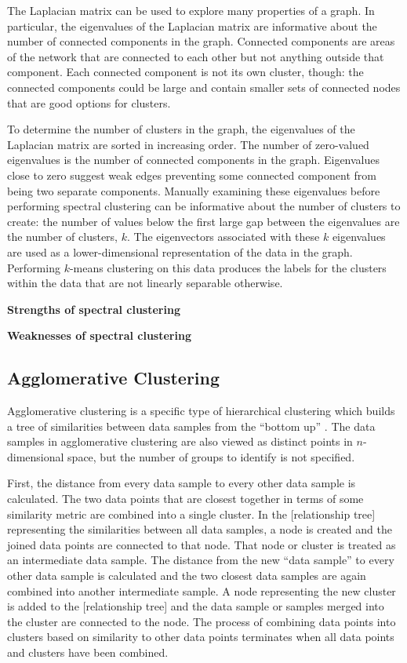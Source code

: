 The Laplacian matrix can be used to explore many properties of a graph. In particular, the eigenvalues of the Laplacian matrix are informative about the number of connected components in the graph. Connected components are areas of the network that are connected to each other but not anything outside that component. Each connected component is not its own cluster, though: the connected components could be large and contain smaller sets of connected nodes that are good options for clusters.

To determine the number of clusters in the graph, the eigenvalues of the Laplacian matrix are sorted in increasing order. The number of zero-valued eigenvalues is the number of connected components in the graph. Eigenvalues close to zero suggest weak edges preventing some connected component from being two separate components. Manually examining these eigenvalues before performing spectral clustering can be informative about the number of clusters to create: the number of values below the first large gap between the eigenvalues are the number of clusters, $k$. The eigenvectors associated with these $k$ eigenvalues are used as a lower-dimensional representation of the data in the graph. Performing $k$-means clustering on this data produces the labels for the clusters within the data that are not linearly separable otherwise.

\textbf{Strengths of spectral clustering}

\textbf{Weaknesses of spectral clustering}

\subsection{Agglomerative Clustering}

Agglomerative clustering is a specific type of hierarchical clustering which builds a tree of similarities between data samples from the ``bottom up'' \cite{Ward1963}. The data samples in agglomerative clustering are also viewed as distinct points in $n$-dimensional space, but the number of groups to identify is not specified. 

First, the distance from every data sample to every other data sample is calculated. The two data points that are closest together in terms of some similarity metric are combined into a single cluster. In the [relationship tree] representing the similarities between all data samples, a node is created and the joined data points are connected to that node. That node or cluster is treated as an intermediate data sample. The distance from the new ``data sample'' to every other data sample is calculated and the two closest data samples are again combined into another intermediate sample. A node representing the new cluster is added to the [relationship tree] and the data sample or samples merged into the cluster are connected to the node. The process of combining data points into clusters based on similarity to other data points terminates when all data points and clusters have been combined. 

